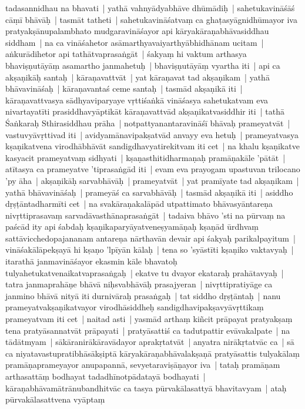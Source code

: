 \documentclass[article,a4paper]{memoir}
\newcommand{\persName}[1]{#1}
\begin{document}
tadasannidhau na bhavati | yathā\- vahnyā\-dyabhā\-ve dhū\-mā\-diḥ | sahetukavinā\-śā\-ś cā\-ṃī\- bhā\-vā\-ḥ | tasmā\-t tatheti | \label{thakur75-115.9}sahetukavinā\-śatvaṃ ca ghaṭasyā\-gnidhū\-mayor iva pratyakṣā\-nupalambhato mudgaravinā\-śayor api kā\-ryakā\-raṇabhā\-vasiddhau siddham | na ca vinā\-śahetor asā\-marthyavaiyarthyā\-bhidhā\-nam ucitam | aṅkurā\-dihetor api tathā\-tvaprasaṅgā\-t | śakyaṃ hi vaktum arthasya bhaviṣṇutā\-yā\-ṃ asamartho janmahetuḥ | bhaviṣṇutā\-yā\-ṃ vyartha iti | \label{thakur75-115.13} api ca akṣaṇikā\-ḥ santaḥ | kā\-raṇavattvā\-t | yat kā\-raṇavat tad akṣaṇikam | yathā\- bhā\-vavinā\-śaḥ | kā\-raṇavantaś ceme santaḥ | tasmā\-d akṣaṇikā\- iti | \label{thakur75-115.15} kā\-raṇavattvasya sā\-dhyaviparyaye vṛttiśaṅkā\- vinā\-śasya sahetukatvam eva nivartayatī\-ti prasiddhavyā\-ptikā\-t kā\-raṇavattvā\-d akṣaṇikatvasiddhir iti | \label{thakur75-115.17} tathā\- Śaṅkaraḥ Sthirasiddhau prā\-ha | notpattyanantaravinā\-śī\- bhā\-vaḥ prameyatvā\-t | vastuvyā\-vṛttivad iti | \label{thakur75-115.18} avidyamā\-navipakṣatvā\-d anvayy eva hetuḥ | prameyatvasya kṣaṇikatvena virodhā\-bhā\-vā\-t sandigdhavyatirekitvam iti cet | \label{thakur75-115.19} na khalu kṣaṇikatve kasyacit prameyatvaṃ sidhyati | kṣaṇasthitidharmaṇaḥ pramā\-ṇakā\-le 'pā\-tā\-t | atī\-tasya ca prameyatve 'tiprasaṅgā\-d iti | \label{thakur75-115.22} evam eva prayogam upastuvan \persName{trilocano} 'py ā\-ha | akṣaṇikā\-ḥ sarvabhā\-vā\-ḥ | prameyatvā\-t | yat pramī\-yate tad akṣaṇikam | yathā\- bhā\-vavinā\-śaḥ | prameyā\-ś ca sarvabhā\-vā\-ḥ | tasmā\-d akṣaṇikā\- iti | \label{thakur75-115.25} asiddho dṛṣṭā\-ntadharmī\-ti cet | na svakā\-raṇakalā\-pā\-d utpattimato bhā\-vasyā\-ntareṇa nivṛttiprasavaṃ sarvadā\-vasthā\-naprasaṅgā\-t | tadaiva bhā\-vo 'sti na pū\-rvaṃ na paścā\-d ity api śabdaḥ kṣaṇikaparyā\-yatveneṣyamā\-ṇaḥ kṣaṇā\-d ū\-rdhvaṃ sattā\-vicchedopajananam antareṇa nā\-rthavā\-n devair api śakyaḥ parikalpayitum | vinā\-śakā\-lā\-pekṣayā\- hi kṣaṇo 'lpī\-yā\-n kā\-laḥ | tena so 'syā\-stī\-ti kṣaṇiko vaktavyaḥ | itarathā\- janmavinā\-śayor ekasmin kā\-le bhavatoḥ tulyahetukatvenaikatvaprasaṅgaḥ | ekatve tu dvayor ekataraḥ prahā\-tavyaḥ | tatra janmaprahā\-ṇe bhā\-vā\- niḥsvabhā\-vā\-ḥ prasajyeran | nivṛttipratiyā\-ge ca janmino bhā\-vā\- nityā\- iti durnivā\-raḥ prasaṅgaḥ | tat siddho dṛṣṭā\-ntaḥ | \label{thakur75-116.1} nanu prameyatvakṣaṇikatvayor virodhā\-siddheḥ sandigdhavipakṣavyā\-vṛttikaṃ prameyatvam iti cet | \label{thakur75-116.2} naitad asti | yasmā\-d arthaṃ kiñcit prā\-payat pratyakṣaṃ tena pratyā\-sannatvā\-t prā\-payati | pratyā\-sattiś ca tadutpattir evā\-vakalpate | na tā\-dā\-tmyam | sā\-kā\-ranirā\-kā\-ravā\-dayor aprakṛtatvā\-t | anyatra nirā\-kṛtatvā\-c ca | sā\- ca niyatavastupratibhā\-sā\-kṣiptā\- kā\-ryakā\-raṇabhā\-valakṣaṇā\- pratyā\-sattis tulyakā\-laṃ pramā\-ṇaprameyayor anupapannā\-, sevyetaraviṣā\-ṇayor iva | tataḥ pramā\-ṇam arthasattā\-ṃ bodhayat tadadhī\-notpā\-datayā\- bodhayati | kā\-raṇabhā\-vamā\-trā\-nubandhitvā\-c ca tasya pū\-rvakā\-lasattyā\- bhavitavyam | ataḥ pū\-rvakā\-lasattvena vyā\-ptaṃ 
\end{document}
